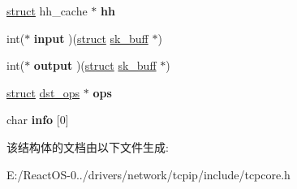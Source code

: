 \begin{DoxyCompactItemize}
\hyperlink{interfacestruct}{struct} hh\+\_\+cache $\ast$ {\bfseries hh}
\item 
\mbox{\label{structdst__entry_aeffe06a977401e153de47f40f30d6d48}} 
int($\ast$ {\bfseries input} )(\hyperlink{interfacestruct}{struct} \hyperlink{structsk__buff}{sk\+\_\+buff} $\ast$)
\item 
\mbox{\label{structdst__entry_af1da51fddf919991eb1cb650f09a0129}} 
int($\ast$ {\bfseries output} )(\hyperlink{interfacestruct}{struct} \hyperlink{structsk__buff}{sk\+\_\+buff} $\ast$)
\item 
\mbox{\label{structdst__entry_a6a57ccb5c9100bb7a62fd9ca95d6d765}} 
\hyperlink{interfacestruct}{struct} \hyperlink{structdst__ops}{dst\+\_\+ops} $\ast$ {\bfseries ops}
\item 
\mbox{\label{structdst__entry_ae0c4a8506493399e3375cc0058cd2b3b}} 
char {\bfseries info} \mbox{[}0\mbox{]}
\end{DoxyCompactItemize}


该结构体的文档由以下文件生成\+:\begin{DoxyCompactItemize}
\item 
E\+:/\+React\+O\+S-\/0../drivers/network/tcpip/include/tcpcore.\+h\end{DoxyCompactItemize}

